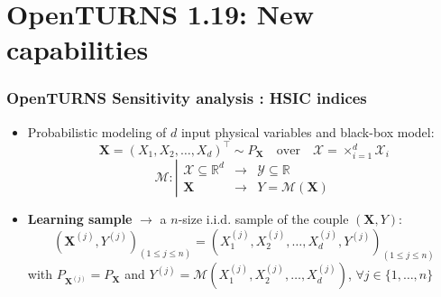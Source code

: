 \documentclass{beamer}
\begin{document}

\section{OpenTURNS 1.19: New capabilities}


\begin{frame}
  \frametitle{OpenTURNS Sensitivity analysis : HSIC indices  }
  
  \small
      \begin{itemize}
        \item Probabilistic modeling of $d$ input physical variables and black-box model:
        \begin{equation*}
        \mathbf{X} = (X_1, X_2, \dots, X_d)^{\top} \sim P_{\mathbf{X}} \quad\mbox{over}\quad \mathcal{X} = \times_{i=1}^{d} \mathcal{X}_i
        \end{equation*}
        \vspace{-10pt}
        \begin{equation*}
        \mathcal{M} : \left|\begin{array}{rcl}
        \mathcal{X} \subseteq \mathbb{R}^d & \longrightarrow & \mathcal{Y} \subseteq \mathbb{R}\\
        \mathbf{X} & \longrightarrow & Y = \mathcal{M}(\mathbf{X})
        \end{array}
        \right.
        \end{equation*}
        \vspace{10pt}
        \item \textbf{Learning sample} $\rightarrow$ a $n$-size i.i.d. sample of the couple $(\mathbf{X},Y)$:
        \begin{equation*}
        \left(\mathbf{X}^{(j)}, Y^{(j)}\right)_{(1\leq j\leq n)} = \left(X_1^{(j)}, X_2^{(j)}, \dots, X_d^{(j)}, Y^{(j)}\right)_{(1\leq j\leq n)}
        \end{equation*}
        with $P_{\mathbf{X}^{(j)}} = P_{\mathbf{X}}$ and $Y^{(j)} = \mathcal{M}\left(X_1^{(j)}, X_2^{(j)}, \dots, X_d^{(j)}\right)$, $\forall j \in \{1,\dots,n\}$
      \end{itemize}
  
  \end{frame}

  
  
\end{document}
